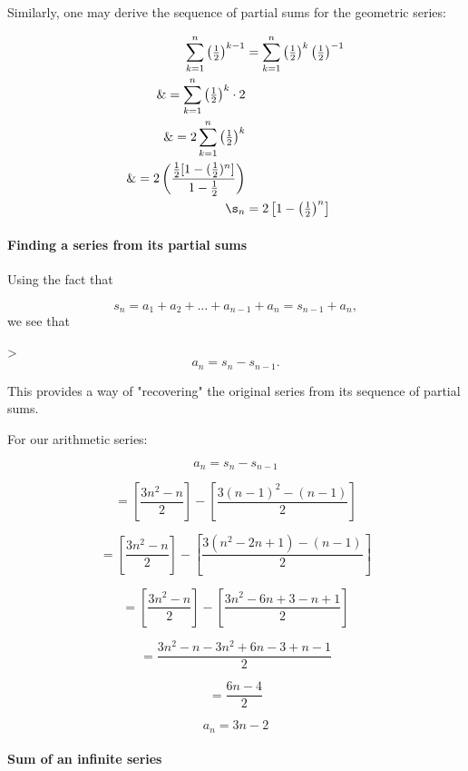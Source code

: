 Similarly, one may derive the sequence of partial sums for the geometric series:



\begin{align}
\sum _{k=1}^{n} \left(\tfrac{1}{2}\right)^{k-1} 

&= \sum _{k=1}^{n} \left(\tfrac{1}{2}\right)^k \left(\tfrac{1}{2}\right)^{-1} \\\&= \sum _{k=1}^{n} \left(\tfrac{1}{2}\right)^k \cdot 2 \\\&= 2\sum _{k=1}^{n} \left(\tfrac{1}{2}\right)^k \\\&= 2\left(\frac{\frac{1}{2}[1-(\tfrac{1}{2})^n]}{1-\tfrac{1}{2}}\right) \\\s_n &= 2\left[1 - \left(\tfrac{1}{2}\right)^n\right]
\end{align}





\paragraph{Finding a series from its partial sums}



Using the fact that



$$s _n=a _1+a _2+\ldots+a _{n-1}+a _n=s _{n-1}+a _n,$$ we see that



> $$a _n=s _n-s _{n-1}.$$



This provides a way of "recovering" the original series from its sequence of partial sums.



For our arithmetic series:



$$a _n = s _n-s _{n-1}$$

$$=\left[\frac{3n^2-n}{2}\right]-\left[\frac{3(n-1)^2-(n-1)}{2}\right]$$

$$=\left[\frac{3n^2-n}{2}\right]-\left[\frac{3(n^2-2n+1)-(n-1)}{2}\right]$$

$$=\left[\frac{3n^2-n}{2}\right]-\left[\frac{3n^2-6n+3-n+1}{2}\right]$$

$$=\frac{3n^2-n-3n^2+6n-3+n-1}{2}$$

$$=\frac{6n-4}{2}$$

$$a _n=3n-2$$



\paragraph{Sum of an infinite series}



